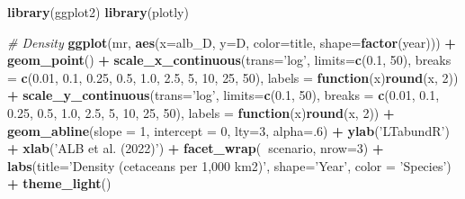 \documentclass[
]{book}
\newenvironment{Shaded}{\begin{snugshade}}{\end{snugshade}}
\newcommand{\CommentTok}[1]{\textcolor[rgb]{0.56,0.35,0.01}{\textit{#1}}}
\newcommand{\ControlFlowTok}[1]{\textcolor[rgb]{0.13,0.29,0.53}{\textbf{#1}}}
\newcommand{\DataTypeTok}[1]{\textcolor[rgb]{0.13,0.29,0.53}{#1}}
\newcommand{\DecValTok}[1]{\textcolor[rgb]{0.00,0.00,0.81}{#1}}
\newcommand{\FloatTok}[1]{\textcolor[rgb]{0.00,0.00,0.81}{#1}}
\newcommand{\KeywordTok}[1]{\textcolor[rgb]{0.13,0.29,0.53}{\textbf{#1}}}
\newcommand{\NormalTok}[1]{#1}
\newcommand{\OperatorTok}[1]{\textcolor[rgb]{0.81,0.36,0.00}{\textbf{#1}}}
\newcommand{\StringTok}[1]{\textcolor[rgb]{0.31,0.60,0.02}{#1}}
\begin{document}
\begin{Shaded}
\begin{Highlighting}[]
\KeywordTok{library}\NormalTok{(ggplot2)}
\KeywordTok{library}\NormalTok{(plotly)}

\CommentTok{# Density}
\KeywordTok{ggplot}\NormalTok{(mr,}
       \KeywordTok{aes}\NormalTok{(}\DataTypeTok{x=}\NormalTok{alb_D, }\DataTypeTok{y=}\NormalTok{D, }\DataTypeTok{color=}\NormalTok{title, }\DataTypeTok{shape=}\KeywordTok{factor}\NormalTok{(year))) }\OperatorTok{+}
\StringTok{    }\KeywordTok{geom_point}\NormalTok{() }\OperatorTok{+}
\StringTok{    }\KeywordTok{scale_x_continuous}\NormalTok{(}\DataTypeTok{trans=}\StringTok{'log'}\NormalTok{, }\DataTypeTok{limits=}\KeywordTok{c}\NormalTok{(}\FloatTok{0.1}\NormalTok{, }\DecValTok{50}\NormalTok{), }
                       \DataTypeTok{breaks =} \KeywordTok{c}\NormalTok{(}\FloatTok{0.01}\NormalTok{, }\FloatTok{0.1}\NormalTok{, }\FloatTok{0.25}\NormalTok{, }\FloatTok{0.5}\NormalTok{, }\FloatTok{1.0}\NormalTok{, }\FloatTok{2.5}\NormalTok{, }\DecValTok{5}\NormalTok{, }\DecValTok{10}\NormalTok{, }\DecValTok{25}\NormalTok{, }\DecValTok{50}\NormalTok{),}
                       \DataTypeTok{labels =} \ControlFlowTok{function}\NormalTok{(x)}\KeywordTok{round}\NormalTok{(x, }\DecValTok{2}\NormalTok{)) }\OperatorTok{+}
\StringTok{    }\KeywordTok{scale_y_continuous}\NormalTok{(}\DataTypeTok{trans=}\StringTok{'log'}\NormalTok{, }\DataTypeTok{limits=}\KeywordTok{c}\NormalTok{(}\FloatTok{0.1}\NormalTok{, }\DecValTok{50}\NormalTok{), }
                       \DataTypeTok{breaks =} \KeywordTok{c}\NormalTok{(}\FloatTok{0.01}\NormalTok{, }\FloatTok{0.1}\NormalTok{, }\FloatTok{0.25}\NormalTok{, }\FloatTok{0.5}\NormalTok{, }\FloatTok{1.0}\NormalTok{, }\FloatTok{2.5}\NormalTok{, }\DecValTok{5}\NormalTok{, }\DecValTok{10}\NormalTok{, }\DecValTok{25}\NormalTok{, }\DecValTok{50}\NormalTok{),}
                       \DataTypeTok{labels =} \ControlFlowTok{function}\NormalTok{(x)}\KeywordTok{round}\NormalTok{(x, }\DecValTok{2}\NormalTok{)) }\OperatorTok{+}
\StringTok{    }\KeywordTok{geom_abline}\NormalTok{(}\DataTypeTok{slope =} \DecValTok{1}\NormalTok{, }\DataTypeTok{intercept =} \DecValTok{0}\NormalTok{, }\DataTypeTok{lty=}\DecValTok{3}\NormalTok{, }\DataTypeTok{alpha=}\NormalTok{.}\DecValTok{6}\NormalTok{) }\OperatorTok{+}
\StringTok{    }\KeywordTok{ylab}\NormalTok{(}\StringTok{'LTabundR'}\NormalTok{) }\OperatorTok{+}\StringTok{ }\KeywordTok{xlab}\NormalTok{(}\StringTok{'ALB et al. (2022)'}\NormalTok{) }\OperatorTok{+}
\StringTok{  }\KeywordTok{facet_wrap}\NormalTok{(}\OperatorTok{~}\NormalTok{scenario, }\DataTypeTok{nrow=}\DecValTok{3}\NormalTok{) }\OperatorTok{+}\StringTok{ }
\StringTok{  }\KeywordTok{labs}\NormalTok{(}\DataTypeTok{title=}\StringTok{'Density (cetaceans per 1,000 km2)'}\NormalTok{, }
       \DataTypeTok{shape=}\StringTok{'Year'}\NormalTok{, }\DataTypeTok{color =} \StringTok{'Species'}\NormalTok{) }\OperatorTok{+}\StringTok{ }
\StringTok{  }\KeywordTok{theme_light}\NormalTok{()}
\end{Highlighting}
\end{Shaded}
\end{document}
